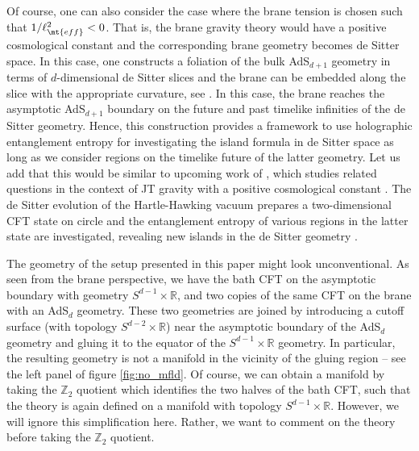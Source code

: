 Of course, one can also consider the case where the brane tension is chosen such that $1/\ell_\mt{eff}^2<0$. That is, the brane gravity theory would have a positive cosmological constant and the corresponding brane geometry becomes de Sitter space. In this case, one constructs a foliation of the bulk AdS$_{d+1}$ geometry in terms of $d$-dimensional de Sitter slices and the brane can be embedded along the slice with the appropriate curvature, \eg see \cite{Karch:2001cw}. In this case, the brane reaches the asymptotic AdS$_{d+1}$ boundary on the future and past timelike infinities of the de Sitter geometry. 
Hence, this construction provides a framework to use holographic entanglement entropy for investigating the island formula in de Sitter space as long as we consider regions on the timelike future of the latter geometry. Let us add that this would be similar to upcoming work of \cite{dSone,dStwo}, which studies related questions in the context of JT gravity with a positive cosmological constant 
\cite{Maldacena:2019cbz}. The de Sitter evolution of the Hartle-Hawking vacuum prepares a two-dimensional CFT state on circle and the entanglement entropy of various regions in the latter state are investigated, revealing new islands in the de Sitter geometry \cite{dSone,dStwo}.\\ 




The geometry of the setup presented in this paper might look unconventional. As seen from the brane perspective, we have the bath CFT on the asymptotic boundary with geometry $S^{d-1} \times \mathbb R$, and two copies of the same CFT on the brane with an AdS$_d$ geometry. These two geometries are joined by introducing a cutoff surface (with topology $S^{d-2} \times \mathbb R$) near the asymptotic boundary of the AdS$_d$ geometry and gluing it to the equator of the  $S^{d-1} \times \mathbb R$ geometry. In particular, the resulting geometry is not a manifold in the vicinity of the gluing region -- see the left panel of figure \ref{fig:no_mfld}. Of course, we can obtain a manifold by taking the $\mathbb Z_2$ quotient which identifies the two halves of the bath CFT, such that the theory is again defined on a manifold with topology $S^{d-1} \times \mathbb R$. However, we will ignore this simplification here. Rather, we want to comment on the theory before taking the $\mathbb Z_2$ quotient. 

